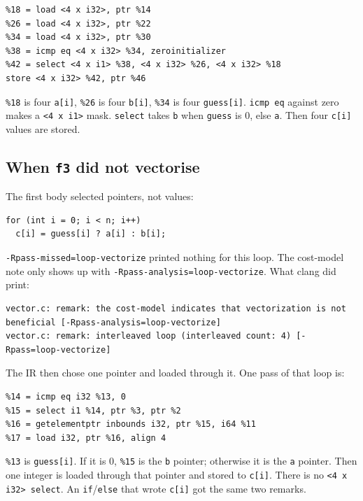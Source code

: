 \documentclass[11pt,a4paper]{article}
\begin{document}
\begin{lstlisting}
%18 = load <4 x i32>, ptr %14
%26 = load <4 x i32>, ptr %22
%34 = load <4 x i32>, ptr %30
%38 = icmp eq <4 x i32> %34, zeroinitializer
%42 = select <4 x i1> %38, <4 x i32> %26, <4 x i32> %18
store <4 x i32> %42, ptr %46
\end{lstlisting}

\texttt{\%18} is four \texttt{a[i]}, \texttt{\%26} is four
\texttt{b[i]}, \texttt{\%34} is four \texttt{guess[i]}.
\texttt{icmp eq} against zero makes a \texttt{<4 x i1>} mask.
\texttt{select} takes \texttt{b} when \texttt{guess} is 0, else
\texttt{a}. Then four \texttt{c[i]} values are stored.

\subsection*{When \texttt{f3} did not vectorise}

The first body selected pointers, not values:

\begin{lstlisting}[language={}]
for (int i = 0; i < n; i++)
  c[i] = guess[i] ? a[i] : b[i];
\end{lstlisting}

\texttt{-Rpass-missed=loop-vectorize} printed nothing for this loop.
The cost-model note only shows up with
\texttt{-Rpass-analysis=loop-vectorize}. What clang did print:

\begin{lstlisting}[language={}]
vector.c: remark: the cost-model indicates that vectorization is not beneficial [-Rpass-analysis=loop-vectorize]
vector.c: remark: interleaved loop (interleaved count: 4) [-Rpass=loop-vectorize]
\end{lstlisting}

The IR then chose one pointer and loaded through it. One pass of
that loop is:

\begin{lstlisting}
%14 = icmp eq i32 %13, 0
%15 = select i1 %14, ptr %3, ptr %2
%16 = getelementptr inbounds i32, ptr %15, i64 %11
%17 = load i32, ptr %16, align 4
\end{lstlisting}

\texttt{\%13} is \texttt{guess[i]}. If it is 0, \texttt{\%15} is the
\texttt{b} pointer; otherwise it is the \texttt{a} pointer. Then one
integer is loaded through that pointer and stored to \texttt{c[i]}.
There is no \texttt{<4 x i32> select}. An \texttt{if}/\texttt{else}
that wrote \texttt{c[i]} got the same two remarks.
\end{document}
